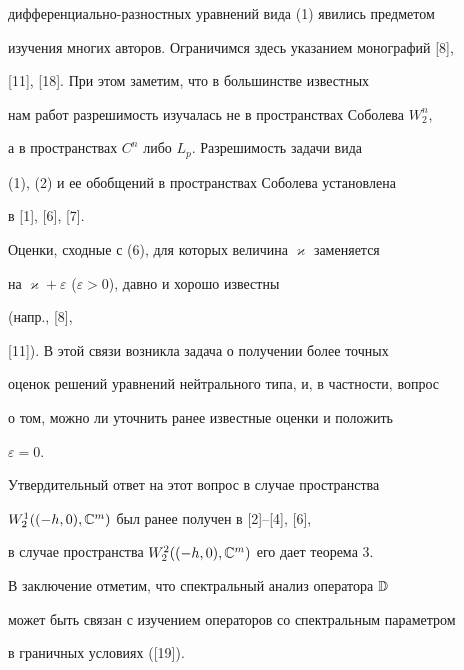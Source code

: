 дифференциально-разностных уравнений вида (1) явились предметом 


изучения многих авторов. Ограничимся здесь указанием монографий [8], 


[11], [18]. При этом заметим, что в большинстве известных 


нам работ разрешимость изучалась не в пространствах Соболева $W^n_2$, 


а в пространствах $C^n$ либо $L_p$. Разрешимость задачи вида 


(1), (2) и ее обобщений в пространствах Соболева установлена 


в [1], [6], [7]. 


 


Оценки, сходные с (6), для которых величина $\varkappa$ заменяется 


на $\varkappa+\varepsilon$ ($\varepsilon>0$), давно и хорошо известны 


(напр., [8], 


[11]). В этой связи возникла задача о получении более точных 


оценок решений уравнений нейтрального типа, и, в частности, вопрос 


о том, можно ли уточнить ранее известные оценки и положить 


$\varepsilon=0$. 


Утвердительный ответ на этот вопрос в случае пространства 


$W^{1}_{2}((-h,0),\Bbb C^m)$ был ранее получен в [2]--[4], [6], 


в случае пространства $W^{2}_{2}((-h,0),\Bbb C^m)$ его дает теорема 3. 


 


В заключение отметим, что спектральный анализ оператора $\Bbb D$ 


может быть связан с изучением операторов со спектральным параметром 


в граничных условиях ([19]). 


 



